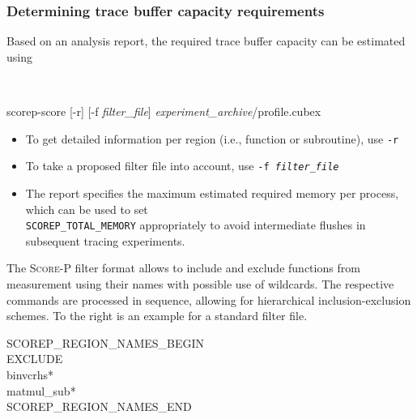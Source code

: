 \documentclass[a4paper]{article}
\newcommand{\Scorep}{\textsc{Score-P}\xspace}
\begin{document}
\subsubsection*{Determining trace buffer capacity requirements}
Based on an analysis report, the required trace buffer capacity can be
estimated using
\begin{flushright}
  \\
  \vspace*{-22mm}
\end{flushright}
\begin{center}
  \ttfamily
  scorep-score [-r] [-f \textit{\rmfamily filter\_file}]
               \textit{\rmfamily experiment\_archive}/profile.cubex
\end{center}
\begin{itemize}
  \item To get detailed information per region (i.e., function or subroutine), use
        \texttt{-r}
  \item To take a proposed filter file into account, use
        \texttt{-f \textit{\rmfamily filter\_file}}
  \item The report specifies the maximum estimated
        required memory per process, which can be used to set\\
        \texttt{SCOREP\_TOTAL\_MEMORY} appropriately to avoid intermediate flushes
        in subsequent tracing experiments.
\end{itemize}

\begin{minipage}[t]{0.5\textwidth}
The \Scorep filter format allows to include and exclude functions from measurement 
using their names with possible use of wildcards. 
The respective commands are processed in sequence, allowing for hierarchical inclusion-exclusion schemes.
To the right is an example for a standard filter file. 
\end{minipage}
\begin{minipage}[t]{0.49\textwidth}
\ttfamily
 \hspace*{2ex} SCOREP\_REGION\_NAMES\_BEGIN \\
 \hspace*{5ex}   EXCLUDE \\
 \hspace*{9ex}     binvcrhs*  \\
 \hspace*{9ex}     matmul\_sub*  \\
 \hspace*{2ex} SCOREP\_REGION\_NAMES\_END
\end{minipage}
\end{document}
